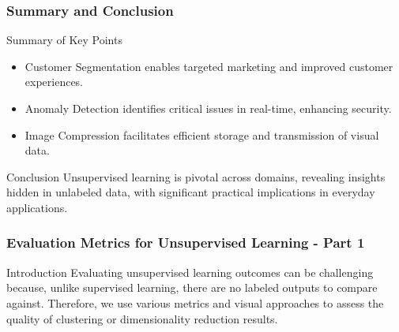 \documentclass[aspectratio=169]{beamer}
\begin{document}
\begin{frame}[fragile]
    \frametitle{Summary and Conclusion}
    \begin{block}{Summary of Key Points}
        \begin{itemize}
            \item Customer Segmentation enables targeted marketing and improved customer experiences.
            \item Anomaly Detection identifies critical issues in real-time, enhancing security.
            \item Image Compression facilitates efficient storage and transmission of visual data.
        \end{itemize}
    \end{block}
    \begin{block}{Conclusion}
        Unsupervised learning is pivotal across domains, revealing insights hidden in unlabeled data, with significant practical implications in everyday applications.
    \end{block}
\end{frame}

\begin{frame}[fragile]
    \frametitle{Evaluation Metrics for Unsupervised Learning - Part 1}
    \begin{block}{Introduction}
        Evaluating unsupervised learning outcomes can be challenging because, unlike supervised learning, there are no labeled outputs to compare against. Therefore, we use various metrics and visual approaches to assess the quality of clustering or dimensionality reduction results.
    \end{block}
\end{frame}
\end{document}
